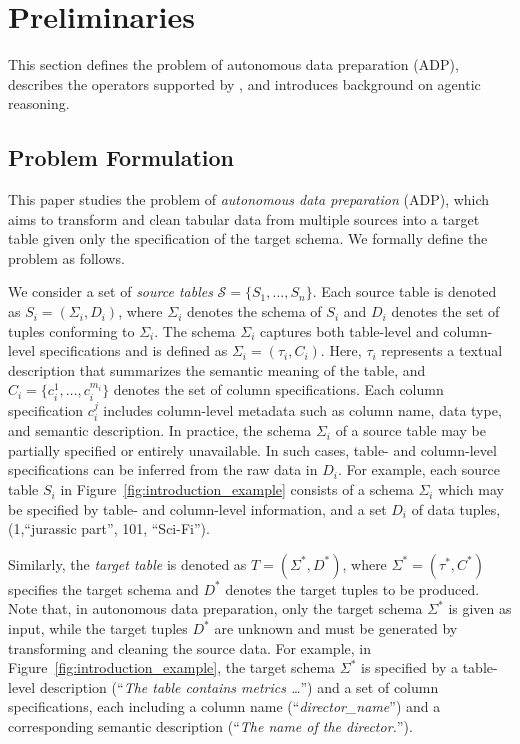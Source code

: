 
\section{Preliminaries}
\label{sec:preliminary}

This section defines the problem of autonomous data preparation (ADP), describes the operators supported by \sys, and introduces background on agentic reasoning.

\subsection{Problem Formulation}
\label{subsec:problem_definition}
This paper studies the problem of \emph{autonomous data preparation} (ADP), which aims to transform and clean tabular data from multiple sources into a target table given only the specification of the target schema.
We formally define the problem as follows.

We consider a set of \emph{source tables} $\mathcal{S} = \{S_1, \ldots, S_n\}$. Each source table is denoted as $S_i = (\Sigma_i, D_i)$, where $\Sigma_i$ denotes the schema of $S_i$ and $D_i$ denotes the set of tuples conforming to $\Sigma_i$. The schema $\Sigma_i$ captures both table-level and column-level specifications and is defined as $\Sigma_i = (\tau_i, C_i)$. Here, $\tau_i$ represents a textual description that summarizes the semantic meaning of the table, and $C_i = \{c_i^{1}, \ldots, c_i^{m_i}\}$ denotes the set of column specifications. Each column specification $c_i^{j}$ includes column-level metadata such as column name, data type, and semantic description.
In practice, the schema $\Sigma_i$ of a source table may be partially specified or entirely unavailable. In such cases, table- and column-level specifications can be inferred from the raw data in $D_i$. For example, each source table $S_i$ in Figure~\ref{fig:introduction_example} consists of a schema $\Sigma_i$ which may be specified by table- and column-level information, and a set $D_i$ of data tuples, \eg (1,``jurassic part'', 101, ``Sci-Fi'').


Similarly, the \emph{target table} is denoted as $T=(\Sigma^{\ast}, D^{\ast})$, where $\Sigma^\ast = (\tau^\ast, C^\ast)$ specifies the target schema and $D^\ast$ denotes the target tuples to be produced. 
Note that, in autonomous data preparation, only the target schema $\Sigma^\ast$ is given as input, while the target tuples $D^\ast$ are unknown and must be generated by transforming and cleaning the source data.
For example, in Figure~\ref{fig:introduction_example}, the target schema $\Sigma^{\ast}$ is specified by a table-level description (\eg ``\emph{The table contains metrics \ldots}'') and a set of column specifications, each including a column name (\eg ``\emph{director\_name}'') and a corresponding semantic description (\eg ``\emph{The name of the director.}'').


